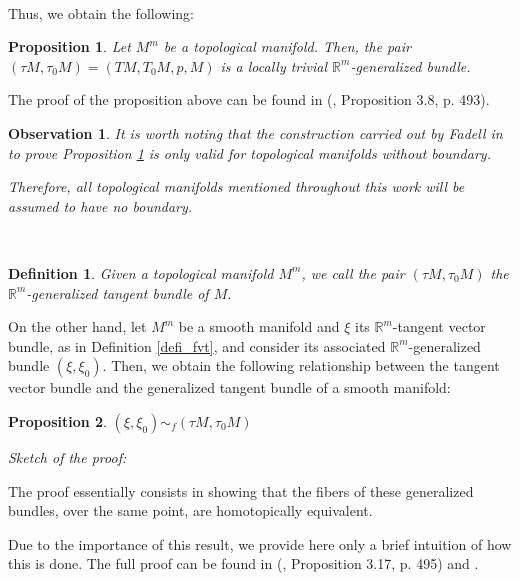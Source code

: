 \documentclass[12pt,oneside]{book}
\newtheorem{defi}   {Definition}[chapter]
\newtheorem{prop}   {Proposition}[chapter]
\newtheorem{obs}    {Observation}[chapter]
\begin{document}
    \
    
    Thus, we obtain the following:
    
    \begin{prop}\label{fgt}
        Let \( M^{m} \) be a topological manifold. Then, the pair \( (\tau M, \tau_{0}M) = (TM, T_{0}M, p, M) \) is a locally 
        trivial \(\mathbb{R}^{m}\)-generalized bundle.
    \end{prop}
    
    The proof of the proposition above can be found in (\cite{fadell_1}, Proposition 3.8, p. 493).
    
    \begin{obs}\label{obs_varied_bordo}
        It is worth noting that the construction carried out by Fadell in \cite{fadell_1} to prove Proposition \ref{fgt} is only valid for 
        topological manifolds without boundary.
        
        Therefore, all topological manifolds mentioned throughout this work will be assumed to have no boundary.
    \end{obs}

    \
    
    \begin{defi}
        Given a topological manifold \( M^{m} \), we call the pair \( (\tau M, \tau_{0}M) \) the \(\mathbb{R}^{m}\)-generalized tangent 
        bundle of \( M \).
    \end{defi}
    
    On the other hand, let \( M^{m} \) be a smooth manifold and \( \xi \) its \(\mathbb{R}^{m}\)-tangent vector 
    bundle, as in Definition \ref{defi_fvt}, and consider its associated \(\mathbb{R}^{m}\)-generalized bundle 
    \( (\xi, \xi_{0}) \). Then, we obtain the following relationship between the tangent vector bundle and the generalized tangent bundle of 
    a smooth manifold:
    
    \begin{prop}\label{fht_tang}
        \( (\xi, \xi_{0}) \sim_{f} (\tau M, \tau_{0}M) \)
    \end{prop}
    
    \textit{Sketch of the proof:}
    
    The proof essentially consists in showing that the fibers of these generalized bundles, over the same point, are homotopically equivalent.
    
    Due to the importance of this result, we provide here only a brief intuition of how this is done. The full proof can be found in 
    (\cite{fadell_1}, Proposition 3.17, p. 495) and \cite{nash}.
    
\end{document}
